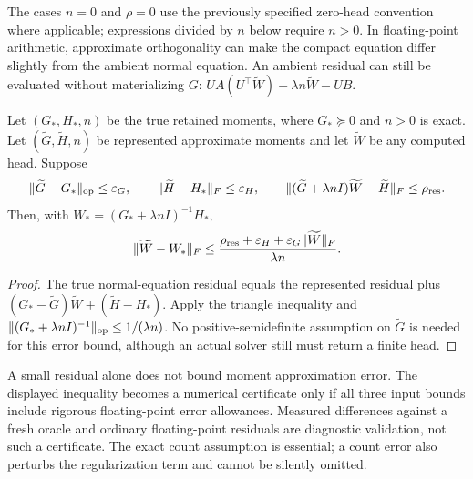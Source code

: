 The cases $n=0$ and $\rho=0$ use the previously specified zero-head
convention where applicable; expressions divided by $n$ below require
$n>0$. In floating-point arithmetic, approximate orthogonality can make
the compact equation differ slightly from the ambient normal equation.
An ambient residual can still be evaluated without materializing $G$:
$UA(U^\top\widetilde W)+\lambda n\widetilde W-UB$.

\begin{proposition}
Let $(G_*,H_*,n)$ be the true retained moments, where $G_*\succeq0$ and
$n>0$ is exact. Let $(\widetilde G,\widetilde H,n)$ be represented
approximate moments and let $\widetilde W$ be any computed head. Suppose
\[
 \|\widetilde G-G_*\|_{\rm op}\le\varepsilon_G,
 \qquad \|\widetilde H-H_*\|_F\le\varepsilon_H,
 \qquad
 \|(\widetilde G+\lambda nI)\widetilde W-\widetilde H\|_F
       \le\rho_{\rm res}.
\]
Then, with $W_*=(G_*+\lambda nI)^{-1}H_*$,
\[
 \|\widetilde W-W_*\|_F
 \le\frac{\rho_{\rm res}+\varepsilon_H+
                      \varepsilon_G\|\widetilde W\|_F}{\lambda n}.
\]
\end{proposition}
\begin{proof}
The true normal-equation residual equals the represented residual plus
$(G_*-\widetilde G)\widetilde W+(\widetilde H-H_*)$.
Apply the triangle inequality and
$\|(G_*+\lambda nI)^{-1}\|_{\rm op}\le1/(\lambda n)$.
No positive-semidefinite assumption on $\widetilde G$ is needed for this
error bound, although an actual solver still must return a finite head.
\end{proof}

A small residual alone does not bound moment approximation error. The
displayed inequality becomes a numerical certificate only if all three
input bounds include rigorous floating-point error allowances. Measured
differences against a fresh oracle and ordinary floating-point residuals
are diagnostic validation, not such a certificate. The exact count
assumption is essential; a count error also perturbs the regularization
term and cannot be silently omitted.
